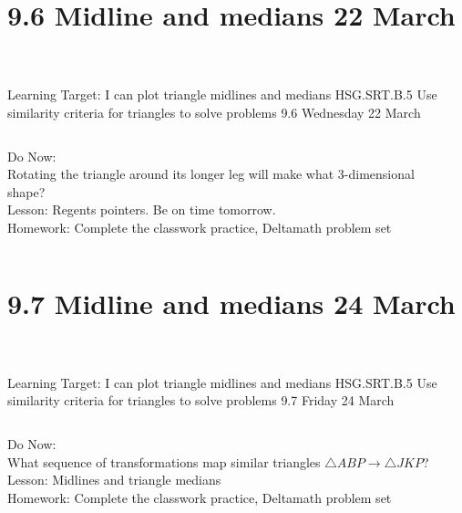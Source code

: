 \section{9.6 Midline and medians \hfill 22 March \,}
\begin{frame}{Learning Target: I can plot triangle midlines and medians}
  {HSG.SRT.B.5 Use similarity criteria for triangles to solve problems \hfill \alert{9.6 Wednesday 22 March}}
  \begin{columns}
    Do Now:\\
    Rotating the triangle around its longer leg will make what 3-dimensional shape? \\[0.5cm]
    Lesson: Regents pointers. Be on time tomorrow. \\[0.5cm]
    Homework: Complete the classwork practice, Deltamath problem set \\[0.5cm]
    \begin{flushright}
    \end{flushright}
  \end{columns}
\end{frame}

\section{9.7 Midline and medians \hfill 24 March \,}
\begin{frame}{Learning Target: I can plot triangle midlines and medians}
  {HSG.SRT.B.5 Use similarity criteria for triangles to solve problems \hfill \alert{9.7 Friday 24 March}}
  \begin{columns}
    Do Now:\\
    What sequence of transformations map similar triangles $\triangle ABP \rightarrow \triangle JKP$? \\[0.5cm]
    Lesson: Midlines and triangle medians \\[0.5cm]
    Homework: Complete the classwork practice, Deltamath problem set \\[0.5cm]
    \begin{flushright}
    \end{flushright}
  \end{columns}
\end{frame}

